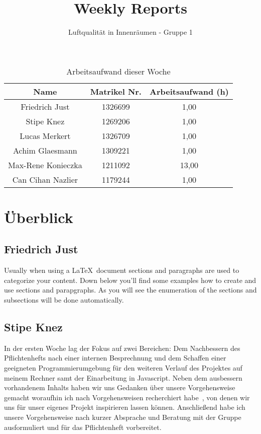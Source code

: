 \documentclass[]{article}
\title{Weekly Reports}
\author{Luftqualität in Innenräumen - Gruppe 1}
\begin{document}
\maketitle

\begin{table}[h!]
	\centering
	\begin{tabular}{|c|c|c|}
		\hline
		{\textbf{Name}}				&		{\textbf{Matrikel Nr.}} & {\textbf{Arbeitsaufwand (h)}} \\
		\hline
		Friedrich Just				&		1326699 				&	1,00	\\
		\hline
		Stipe Knez				&		1269206 				&	1,00	\\
		\hline
		Lucas Merkert				&		1326709					&	1,00	\\
		\hline
		Achim Glaesmann				&		1309221					&	1,00	\\
		\hline
		Max-Rene Konieczka			&		1211092					&	13,00	\\
		\hline
		Can Cihan Nazlier			&		1179244					&	1,00	\\
		\hline
	\end{tabular}
	\caption{Arbeitsaufwand dieser Woche}
	\label{tab:worakload}
\end{table}



\section{Überblick}


\subsection{Friedrich Just}
Usually when using a \LaTeX\ document sections and paragraphs are used to categorize your content. Down below you'll find some examples how to create and use sections and parapgraphs. As you will see the enumeration of the sections and subsections will be done automatically. 

\subsection{Stipe Knez}
In der ersten  Woche lag der Fokus auf zwei Bereichen: Dem Nachbessern des Pflichtenhefts nach einer internen Besprechnung und dem Schaffen einer geeigneten Programmierumgebung für den weiteren Verlauf des Projektes auf meinem Rechner samt der Einarbeitung in Javascript.
Neben dem ausbessern vorhandenem Inhalts haben wir uns Gedanken über unsere Vorgehensweise gemacht woraufhin ich nach Vorgehensweisen recherchiert habe~\cite{scrum}, von denen wir uns für unser eigenes Projekt inspirieren lassen können. Anschließend habe ich unsere Vorgehensweise nach kurzer Absprache und Beratung mit der Gruppe ausformuliert und für das Pflichtenheft vorbereitet.
\end{document}

